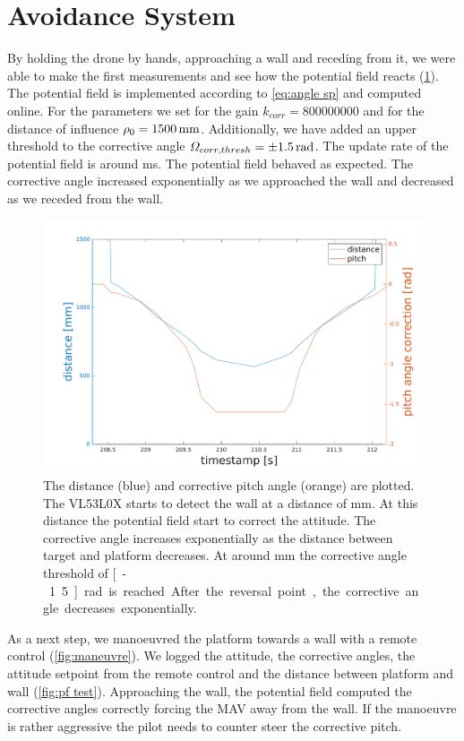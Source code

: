\section{Avoidance System}
\label{sec:avoidance}
By holding the drone by hands, approaching a wall and receding from it, we were able to make the first measurements and see how the potential field reacts (\cref{fig:pf}). The potential field is implemented according to \cref{eq:angle sp} and computed online. For the parameters we set for the gain $k_{corr}=800000000$ and for the distance of influence $\rho_0=\unit[1500]{mm}$. Additionally, we have added an upper threshold to the corrective angle $\Omega_{corr,thresh}=\unit[\pm1.5]{rad}$. The update rate of the potential field is around \unit[200]{ms}. The potential field behaved as expected. The corrective angle increased exponentially as we approached the wall and decreased as we receded from the wall.\\
\begin{figure}
	\centering
	\includegraphics[width=0.9\linewidth]{pictures/plot_pf.pdf}
	\caption{The distance (blue) and corrective pitch angle (orange) are plotted. The VL53L0X starts to detect the wall at a distance of \unit[1200]{mm}. At this distance the potential field start to correct the attitude. The corrective angle increases exponentially as the distance between target and platform decreases. At around \unit[600]{mm} the corrective angle threshold of \unit[-1.5]{rad} is reached. After the reversal point, the corrective angle decreases exponentially.}
	\label{fig:pf}
\end{figure}
As a next step, we manoeuvred the platform towards a wall with a remote control (\cref{fig:maneuvre}). We logged the attitude, the corrective angles, the attitude setpoint from the remote control and the distance between platform and wall (\cref{fig:pf test}). Approaching the wall, the potential field computed the corrective angles correctly forcing the MAV away from the wall. If the manoeuvre is rather aggressive the pilot needs to counter steer the corrective pitch.
